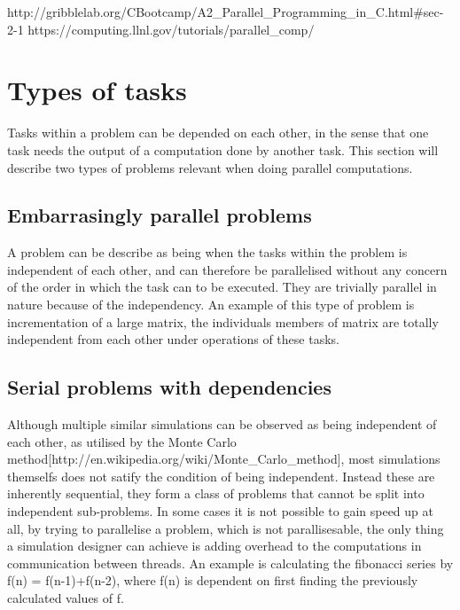 http://gribblelab.org/CBootcamp/A2_Parallel_Programming_in_C.html#sec-2-1
https://computing.llnl.gov/tutorials/parallel_comp/

\section{Types of tasks}
\label{top}

Tasks within a problem can be depended on each other, in the sense that one task needs the output of a computation done by another task. This section will describe two types of problems relevant when doing parallel computations.

\subsection{Embarrasingly parallel problems}
  A problem can be describe as being  when the tasks within the problem is independent of each other, and can therefore be parallelised without any concern of the order in which the task can to be executed. They are trivially parallel in nature because of the independency.
  An example of this type of problem is incrementation of a large matrix, the individuals members of matrix are totally independent from each other under operations of these tasks.

\subsection{Serial problems with dependencies}
  Although multiple similar simulations can be observed as being independent of each other, as utilised by the Monte Carlo method[http://en.wikipedia.org/wiki/Monte_Carlo_method], most simulations themselfs does not satify the condition of being independent. Instead these are inherently sequential, they form a class of problems that cannot be split into independent sub-problems. In some cases it is not possible to gain speed up at all, by trying to parallelise a problem, which is not parallisesable, the only thing a simulation designer can achieve is adding overhead to the computations in communication between threads.
  An example is calculating the fibonacci series by f(n) = f(n-1)+f(n-2), where f(n) is dependent on first finding the previously calculated values of f.
